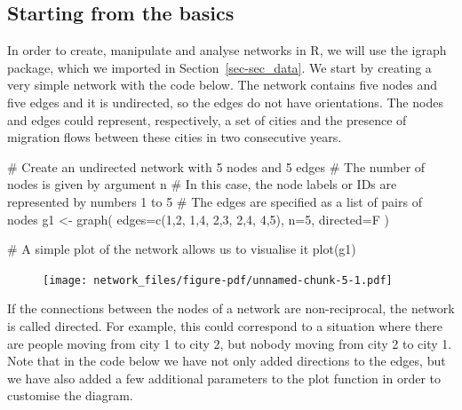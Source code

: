 \documentclass[
  letterpaper,
  DIV=11,
  numbers=noendperiod]{scrreprt}
\newenvironment{Shaded}{\begin{snugshade}}{\end{snugshade}}
\newcommand{\AttributeTok}[1]{\textcolor[rgb]{0.40,0.45,0.13}{#1}}
\newcommand{\CommentTok}[1]{\textcolor[rgb]{0.37,0.37,0.37}{#1}}
\newcommand{\DecValTok}[1]{\textcolor[rgb]{0.68,0.00,0.00}{#1}}
\newcommand{\FunctionTok}[1]{\textcolor[rgb]{0.28,0.35,0.67}{#1}}
\newcommand{\NormalTok}[1]{\textcolor[rgb]{0.00,0.23,0.31}{#1}}
\newcommand{\OtherTok}[1]{\textcolor[rgb]{0.00,0.23,0.31}{#1}}
\begin{document}
\hypertarget{starting-from-the-basics}{%
\subsection{Starting from the basics}\label{starting-from-the-basics}}

In order to create, manipulate and analyse networks in R, we will use
the igraph package, which we imported in Section~\ref{sec-sec_data}. We
start by creating a very simple network with the code below. The network
contains five nodes and five edges and it is undirected, so the edges do
not have orientations. The nodes and edges could represent,
respectively, a set of cities and the presence of migration flows
between these cities in two consecutive years.

\begin{Shaded}
\begin{Highlighting}[]
\CommentTok{\# Create an undirected network with 5 nodes and 5 edges}
\CommentTok{\# The number of nodes is given by argument n}
\CommentTok{\# In this case, the node labels or IDs are represented by numbers 1 to 5}
\CommentTok{\# The edges are specified as a list of pairs of nodes}
\NormalTok{g1 }\OtherTok{\textless{}{-}} \FunctionTok{graph}\NormalTok{( }\AttributeTok{edges=}\FunctionTok{c}\NormalTok{(}\DecValTok{1}\NormalTok{,}\DecValTok{2}\NormalTok{, }\DecValTok{1}\NormalTok{,}\DecValTok{4}\NormalTok{, }\DecValTok{2}\NormalTok{,}\DecValTok{3}\NormalTok{, }\DecValTok{2}\NormalTok{,}\DecValTok{4}\NormalTok{, }\DecValTok{4}\NormalTok{,}\DecValTok{5}\NormalTok{), }\AttributeTok{n=}\DecValTok{5}\NormalTok{, }\AttributeTok{directed=}\NormalTok{F ) }

\CommentTok{\# A simple plot of the network allows us to visualise it}
\FunctionTok{plot}\NormalTok{(g1) }
\end{Highlighting}
\end{Shaded}

\begin{figure}[H]

{\centering \texttt{[image: network\_files/figure-pdf/unnamed-chunk-5-1.pdf]}

}

\end{figure}

If the connections between the nodes of a network are non-reciprocal,
the network is called directed. For example, this could correspond to a
situation where there are people moving from city 1 to city 2, but
nobody moving from city 2 to city 1. Note that in the code below we have
not only added directions to the edges, but we have also added a few
additional parameters to the plot function in order to customise the
diagram.
\end{document}
